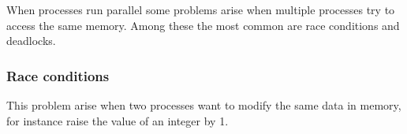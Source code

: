 When processes run parallel some problems arise when multiple processes try to access the same memory. Among these the most common are race conditions and deadlocks.

\subsubsection{Race conditions}
This problem arise when two processes want to modify the same data in memory, for instance raise the value of an integer by 1.